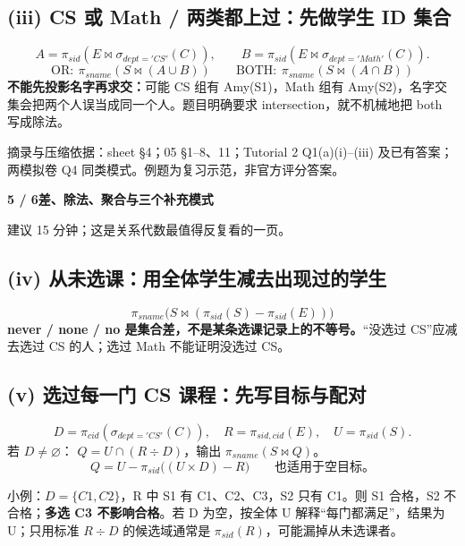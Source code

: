 \documentclass[11pt,a4paper]{article}
\newcommand{\stitle}[2]{{\sffamily\LARGE\bfseries\color{CUHKPurple}#1}\par{\small\color{Muted}#2}\par\vspace{3mm}}
\newcommand{\src}[1]{\par\vfill{\footnotesize\color{Muted}摘录与压缩依据：#1。例题为复习示范，非官方评分答案。}}
\begin{document}
\subsection{(iii) CS 或 Math / 两类都上过：先做学生 ID 集合}
\[
A=\pi_{sid}(E\bowtie\sigma_{dept='CS'}(C)),\qquad
B=\pi_{sid}(E\bowtie\sigma_{dept='Math'}(C)).
\]
\[
\boxed{\text{OR}:\ \pi_{sname}(S\bowtie(A\cup B))}\qquad
\boxed{\text{BOTH}:\ \pi_{sname}(S\bowtie(A\cap B))}
\]
\textbf{不能先投影名字再求交：}可能 CS 组有 Amy(S1)，Math 组有 Amy(S2)，名字交集会把两个人误当成同一个人。题目明确要求 intersection，就不机械地把 both 写成除法。
\src{sheet §4；05 §1--8、11；Tutorial 2 Q1(a)(i)--(iii) 及已有答案；两模拟卷 Q4 同类模式}

\clearpage
\stitle{5 / 6\quad 差、除法、聚合与三个补充模式}{建议 15 分钟；这是关系代数最值得反复看的一页。}
\subsection{(iv) 从未选课：用全体学生减去出现过的学生}
\[
\boxed{\pi_{sname}\bigl(S\bowtie(\pi_{sid}(S)-\pi_{sid}(E))\bigr)}
\]
\textbf{never / none / no 是集合差，不是某条选课记录上的不等号。}“没选过 CS”应减去选过 CS 的人；选过 Math 不能证明没选过 CS。

\subsection{(v) 选过每一门 CS 课程：先写目标与配对}
\[
D=\pi_{cid}(\sigma_{dept='CS'}(C)),\quad R=\pi_{sid,cid}(E),\quad U=\pi_{sid}(S).
\]
若 $D\ne\varnothing$：\; $Q=U\cap(R\div D)$，输出 $\pi_{sname}(S\bowtie Q)$。
\[
\boxed{Q=U-\pi_{sid}\bigl((U\times D)-R\bigr)}\qquad\text{也适用于空目标。}
\]
\begin{center}\end{center}
小例：$D=\{C1,C2\}$，R 中 S1 有 C1、C2、C3，S2 只有 C1。则 S1 合格，S2 不合格；\textbf{多选 C3 不影响合格}。若 D 为空，按全体 U 解释“每门都满足”，结果为 U；只用标准 $R\div D$ 的候选域通常是 $\pi_{sid}(R)$，可能漏掉从未选课者。
\end{document}
